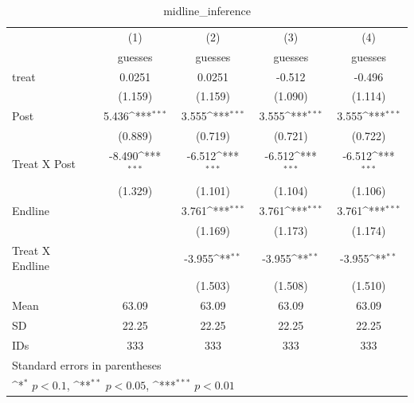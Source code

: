 \begin{table}[htbp]\centering
\def\sym#1{\ifmmode^{#1}\else\(^{#1}\)\fi}
\caption{midline\_inference}
\begin{tabular}{l*{4}{c}}
\hline\hline
                                &\multicolumn{1}{c}{(1)}&\multicolumn{1}{c}{(2)}&\multicolumn{1}{c}{(3)}&\multicolumn{1}{c}{(4)}\\
                                &\multicolumn{1}{c}{guesses}&\multicolumn{1}{c}{guesses}&\multicolumn{1}{c}{guesses}&\multicolumn{1}{c}{guesses}\\
\hline
treat                           &   0.0251         &   0.0251         &   -0.512         &   -0.496         \\
                                &  (1.159)         &  (1.159)         &  (1.090)         &  (1.114)         \\
Post                            &    5.436\sym{***}&    3.555\sym{***}&    3.555\sym{***}&    3.555\sym{***}\\
                                &  (0.889)         &  (0.719)         &  (0.721)         &  (0.722)         \\
Treat X Post                    &   -8.490\sym{***}&   -6.512\sym{***}&   -6.512\sym{***}&   -6.512\sym{***}\\
                                &  (1.329)         &  (1.101)         &  (1.104)         &  (1.106)         \\
Endline                         &                  &    3.761\sym{***}&    3.761\sym{***}&    3.761\sym{***}\\
                                &                  &  (1.169)         &  (1.173)         &  (1.174)         \\
Treat X Endline                 &                  &   -3.955\sym{**} &   -3.955\sym{**} &   -3.955\sym{**} \\
                                &                  &  (1.503)         &  (1.508)         &  (1.510)         \\
\hline
Mean                            &    63.09         &    63.09         &    63.09         &    63.09         \\
SD                              &    22.25         &    22.25         &    22.25         &    22.25         \\
IDs                             &      333         &      333         &      333         &      333         \\
\hline\hline
\multicolumn{5}{l}{\footnotesize Standard errors in parentheses}\\
\multicolumn{5}{l}{\footnotesize \sym{*} \(p<0.1\), \sym{**} \(p<0.05\), \sym{***} \(p<0.01\)}\\
\end{tabular}
\end{table}
